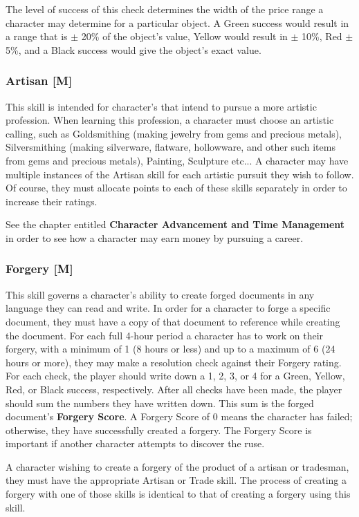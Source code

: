 \documentclass[oneside]{book}
\begin{document}
\begin{multicols}{2}
The level of success of this check determines the width of the price range a character may determine for a particular object. A Green success would result in a range that is $\pm$ 20\% of the object's value, Yellow would result in $\pm$ 10\%, Red $\pm$ 5\%, and a Black success would give the object's exact value.
\subsubsection{Artisan [M]}
This skill is intended for character's that intend to pursue a more artistic profession. When learning this profession, a character must choose an artistic calling, such as Goldsmithing (making jewelry from gems and precious metals), Silversmithing (making silverware, flatware, hollowware, and other such items from gems and precious metals), Painting, Sculpture etc... A character may have multiple instances of the Artisan skill for each artistic pursuit they wish to follow. Of course, they must allocate points to each of these skills separately in order to increase their ratings. 

See the chapter entitled \textbf{Character Advancement and Time Management} in order to see how a character may earn money by pursuing a career. 
\subsubsection{Forgery [M]}
This skill governs a character's ability to create forged documents in any language they can read and write. In order for a character to forge a specific document, they must have a copy of that document to reference while creating the document. For each full 4-hour period a character has to work on their forgery, with a minimum of 1 (8 hours or less) and up to a maximum of 6 (24 hours or more), they may make a resolution check against their Forgery rating. For each check, the player should write down a 1, 2, 3, or 4 for a Green, Yellow, Red, or Black success, respectively. After all checks have been made, the player should sum the numbers they have written down. This sum is the forged document's \textbf{Forgery Score}. A Forgery Score of 0 means the character has failed; otherwise, they have successfully created a forgery. The Forgery Score is important if another character attempts to discover the ruse.

A character wishing to create a forgery of the product of a artisan or tradesman, they must have the appropriate Artisan or Trade skill. The process of creating a forgery with one of those skills is identical to that of creating a forgery using this skill.

\end{multicols}
\end{document}
